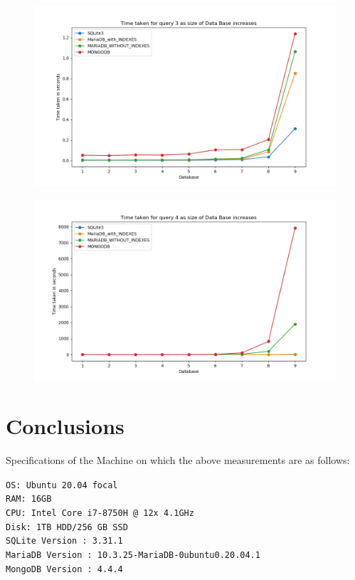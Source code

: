 \documentclass[12pt]{article}
\begin{document}
\begin{figure}[H]
  \centering
  \includegraphics[width=.95\linewidth]{db_size_time/3.png}
\end{figure}

\begin{figure}[H]
  \centering
  \includegraphics[width=.95\linewidth]{db_size_time/4.png}
\end{figure}

\section{Conclusions}

Specifications of the Machine on which the above measurements are as follows:
\begin{center}
\texttt{OS: Ubuntu 20.04 focal} \\
\texttt{RAM: 16GB} \\
\texttt{CPU: Intel Core i7-8750H @ 12x 4.1GHz} \\
\texttt{Disk: 1TB HDD/256 GB SSD} \\
\texttt{SQLite Version : 3.31.1} \\
\texttt{MariaDB Version : 10.3.25-MariaDB-0ubuntu0.20.04.1}\\
\texttt{MongoDB Version : 4.4.4}\\
\end{center}
\end{document}
